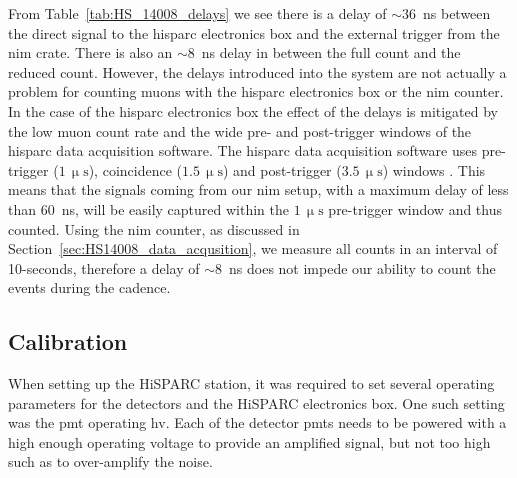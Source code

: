 
From Table~\ref{tab:HS_14008_delays} we see there is a delay of $\sim36$~ns between the direct signal to the \gls{hisparc} electronics box and the external trigger from the \gls{nim} crate. There is also an $\sim8$~ns delay in between the full count and the reduced count. However, the delays introduced into the system are not actually a problem for counting muons with the \gls{hisparc} electronics box or the \gls{nim} counter. In the case of the \gls{hisparc} electronics box the effect of the delays is mitigated by the low muon count rate and the wide pre- and post-trigger windows of the \gls{hisparc} data acquisition software. The \gls{hisparc} data acquisition software uses pre-trigger ($1\,\upmu\mathrm{s}$), coincidence ($1.5\,\upmu\mathrm{s}$) and post-trigger ($3.5\,\upmu\mathrm{s}$) windows \citep{fokkema_hisparc_2012}. This means that the signals coming from our \gls{nim} setup, with a maximum delay of less than 60~ns, will be easily captured within the $1\,\upmu\mathrm{s}$ pre-trigger window and thus counted. Using the \gls{nim} counter, as discussed in Section~\ref{sec:HS14008_data_acqusition}, we measure all counts in an interval of 10-seconds, therefore a delay of $\sim8$~ns does not impede our ability to count the events during the cadence.


\subsection{Calibration}

When setting up the HiSPARC station, it was required to set several operating parameters for the detectors and the HiSPARC electronics box. One such setting was the \gls{pmt} operating \gls{hv}. Each of the detector \glspl{pmt} needs to be powered with a high enough operating voltage to provide an amplified signal, but not too high such as to over-amplify the noise.

